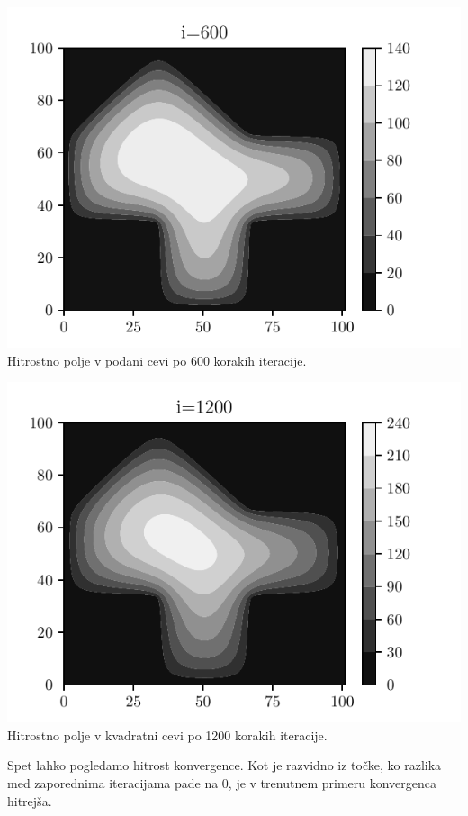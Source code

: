 \begin{center}
    \begin{minipage}{0.45\textwidth}
        \centering
    \includegraphics[width=\textwidth]{../old/1-hiska_i600.pdf}
    {Hitrostno polje v podani cevi po 600 korakih iteracije.}
    \end{minipage}\hfill
    \begin{minipage}{0.45\textwidth}
        \centering
        \includegraphics[width=1\textwidth]{../old/1-hiska_i1200.pdf}
    {Hitrostno polje v kvadratni cevi po 1200 korakih iteracije.}
    \end{minipage}
\end{center}
Spet lahko pogledamo hitrost konvergence. Kot je razvidno iz točke, ko razlika med zaporednima iteracijama pade na 0, je v trenutnem primeru konvergenca hitrejša.
